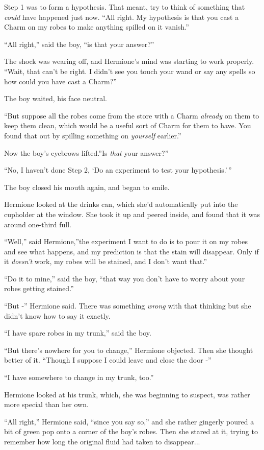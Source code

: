 Step 1 was to form a hypothesis. That meant, try to think of something
that \emph{could} have happened just now. ``All right. My hypothesis is
that you cast a Charm on my robes to make anything spilled on it
vanish.''

``All right,'' said the boy, ``is that your answer?''

The shock was wearing off, and Hermione's mind was starting to work
properly. ``Wait, that can't be right. I didn't see you touch your wand
or say any spells so how could you have cast a Charm?''

The boy waited, his face neutral.

``But suppose all the robes come from the store with a Charm
\emph{already} on them to keep them clean, which would be a useful sort
of Charm for them to have. You found that out by spilling something on
\emph{yourself} earlier.''

Now the boy's eyebrows lifted.''Is \emph{that} your answer?''

``No, I haven't done Step 2, `Do an experiment to test your
hypothesis.'\,''

The boy closed his mouth again, and began to smile.

Hermione looked at the drinks can, which she'd automatically put into
the cupholder at the window. She took it up and peered inside, and found
that it was around one-third full.

``Well,'' said Hermione,''the experiment I want to do is to pour it on
my robes and see what happens, and my prediction is that the stain will
disappear. Only if it \emph{doesn't} work, my robes will be stained, and
I don't want that.''

``Do it to mine,'' said the boy, ``that way you don't have to worry
about your robes getting stained.''

``But -'' Hermione said. There was something \emph{wrong} with that
thinking but she didn't know how to say it exactly.

``I have spare robes in my trunk,'' said the boy.

``But there's nowhere for you to change,'' Hermione objected. Then she
thought better of it. ``Though I suppose I could leave and close the
door -''

``I have somewhere to change in my trunk, too.''

Hermione looked at his trunk, which, she was beginning to suspect, was
rather more special than her own.

``All right,'' Hermione said, ``since you say so,'' and she rather
gingerly poured a bit of green pop onto a corner of the boy's robes.
Then she stared at it, trying to remember how long the original fluid
had taken to disappear...


